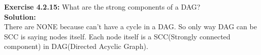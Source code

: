 \documentclass[11pt,fleqn]{article}
\begin{document}
\textbf{Exercise 4.2.15:} What are the strong components of a DAG?\\

\textbf{Solution:}\\
There are NONE because can't have a cycle in a DAG. So only way DAG can be SCC is saying nodes itself. Each node itself is a SCC(Strongly connected component) in DAG(Directed Acyclic Graph).

	
\end{document}
